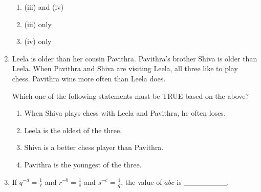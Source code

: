 \documentclass[journal,11pt,onecolumn]{IEEEtran}
\begin{document}
\begin{enumerate}[resume]
\begin{enumerate}
              \item (iii) and (iv)

              \item (iii) only

              \item (iv) only

          \end{enumerate}

    \item Leela is older than her cousin Pavithra. Pavithra's brother Shiva is older than Leela. When Pavithra and Shiva are visiting Leela, all three like to play chess. Pavithra wins more often than Leela does.

          Which one of the following statements must be TRUE based on the above?

          \begin{enumerate}

              \item When Shiva plays chess with Leela and Pavithra, he often loses.

              \item Leela is the oldest of the three.

              \item Shiva is a better chess player than Pavithra.

              \item Pavithra is the youngest of the three.

          \end{enumerate}

    \item If $q^{-a}=\frac{1}{r}$ and $r^{-b}=\frac{1}{s}$ and $s^{-c}=\frac{1}{q}$, the value of $abc$ is \_\_\_\_\_\_\_\_.

          \begin{enumerate}



\end{enumerate}
\end{enumerate}
\end{document}
